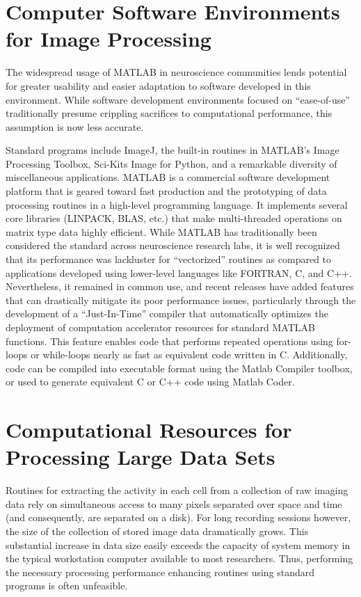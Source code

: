 \section{Computer Software Environments for Image Processing}\label{sec:computer-software-environments-for-image-processing}

The widespread usage of MATLAB in neuroscience communities lends potential for greater usability and easier adaptation to software developed in this environment.
While software development environments focused on ``ease-of-use'' traditionally presume crippling sacrifices to computational performance, this assumption is now less accurate.

Standard programs include ImageJ, the built-in routines in MATLAB's Image Processing Toolbox, Sci-Kits Image for Python, and a remarkable diversity of miscellaneous applications.
MATLAB is a commercial software development platform that is geared toward fast production and the prototyping of data processing routines in a high-level programming language.
It implements several core libraries (LINPACK, BLAS, etc.)
that make multi-threaded operations on matrix type data highly
efficient.
While MATLAB has traditionally been considered the standard across neuroscience research labs, it is well recognized that its performance was lackluster for ``vectorized'' routines as compared to applications developed using lower-level languages like FORTRAN, C, and C++.
Nevertheless, it remained in common use, and recent releases have added features that can drastically mitigate its poor performance issues, particularly through the development of a ``Just-In-Time'' compiler that automatically optimizes the deployment of computation accelerator resources for standard MATLAB functions.
This feature enables code that performs repeated operations using for-loops or while-loops nearly as fast as equivalent code written in C.
Additionally, code can be compiled into executable format using the Matlab Compiler toolbox, or used to generate equivalent C or C++ code using Matlab Coder.

\section{Computational Resources for Processing Large Data Sets}\label{sec:computational-resources-for-processing-large-data-sets}

Routines for extracting the activity in each cell from a collection of raw imaging data rely on simultaneous access to many pixels separated over space and time (and consequently, are separated on a disk).
For long recording sessions however, the size of the collection of stored image data dramatically grows.
This substantial increase in data size easily exceeds the capacity of system memory in the typical workstation computer available to most researchers.
Thus, performing the necessary processing performance enhancing routines using standard programs is often unfeasible.

